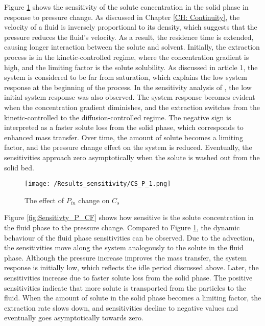 \documentclass[../Article_Sensitivity_Analsysis.tex]{subfiles}
\begin{document}
	Figure \ref{fig:Sensitivty_P_CS} shows the sensitivity of the solute concentration in the solid phase in response to pressure change. As discussed in Chapter \ref{CH: Continuity}, the velocity of a fluid is inversely proportional to its density, which suggests that the pressure reduces the fluid's velocity. As a result, the residence time is extended, causing longer interaction between the solute and solvent. Initially, the extraction process is in the kinetic-controlled regime, where the concentration gradient is high, and the limiting factor is the solute solubility. As discussed in {\color{red}article 1}, the system is considered to be far from saturation, which explains the low system response at the beginning of the process. In the sensitivity analysis of \citet{Fiori_2007}, the low initial system response was also observed. The system response becomes evident when the concentration gradient diminishes, and the extraction switches from the kinetic-controlled to the diffusion-controlled regime. The negative sign is interpreted as a faster solute loss from the solid phase, which corresponds to enhanced mass transfer. Over time, the amount of solute becomes a limiting factor, and the pressure change effect on the system is reduced. Eventually, the sensitivities approach zero asymptotically when the solute is washed out from the solid bed.

	\begin{figure}[!ht]
		\centering
		\texttt{[image: /Results\_sensitivity/CS\_P\_1.png]}
		\caption{The effect of $P_{in}$ change on $C_s$}
		\label{fig:Sensitivty_P_CS}
	\end{figure}
	
	Figure \ref{fig:Sensitivty_P_CF} shows how sensitive is the solute concentration in the fluid phase to the pressure change. Compared to Figure \ref{fig:Sensitivty_P_CS}, the dynamic behaviour of the fluid phase sensitivities can be observed. Due to the advection, the sensitivities move along the system analogously to the solute in the fluid phase. Although the pressure increase improves the mass transfer, the system response is initially low, which reflects the idle period discussed above. Later, the sensitivities increase due to faster solute loss from the solid phase. The positive sensitivities indicate that more solute is transported from the particles to the fluid. When the amount of solute in the solid phase becomes a limiting factor, the extraction rate slows down, and sensitivities decline to negative values and eventually goes asymptotically towards zero.
	
\end{document}
